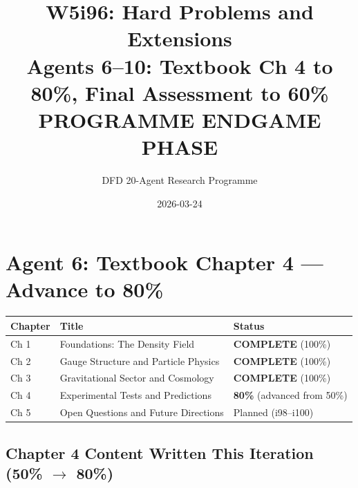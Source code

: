 \documentclass[11pt,a4paper]{article}
\title{W5i96: Hard Problems and Extensions\\[6pt]
\large Agents 6--10: Textbook Ch 4 to 80\%, Final Assessment to 60\%\\[6pt]
\normalsize \textbf{PROGRAMME ENDGAME PHASE}}
\author{DFD 20-Agent Research Programme}
\date{2026-03-24}
\begin{document}
\maketitle

\section{Agent 6: Textbook Chapter 4 --- Advance to 80\%}

\begin{tcolorbox}[colback=blue!5!white, colframe=dfdblue, title=\textbf{TEXTBOOK: ``Density Field Dynamics'' --- Chapter Status}]
\begin{center}
\begin{tabular}{lll}
\toprule
\textbf{Chapter} & \textbf{Title} & \textbf{Status} \\
\midrule
Ch 1 & Foundations: The Density Field & \textbf{COMPLETE} (100\%) \\
Ch 2 & Gauge Structure and Particle Physics & \textbf{COMPLETE} (100\%) \\
Ch 3 & Gravitational Sector and Cosmology & \textbf{COMPLETE} (100\%) \\
Ch 4 & Experimental Tests and Predictions & \textbf{80\%} (advanced from 50\%) \\
Ch 5 & Open Questions and Future Directions & Planned (i98--i100) \\
\bottomrule
\end{tabular}
\end{center}
\end{tcolorbox}

\subsection{Chapter 4 Content Written This Iteration (50\% $\to$ 80\%)}
\end{document}
